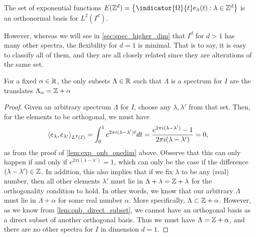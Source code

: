 \documentclass[../thesis.tex]{subfiles}
\begin{document}
\begin{theorem}\label{lem:z_d_in_higer_d}
    The set of exponential functions $E(\Z^d) = \braqMed{\indicator{\Omega}{t} e_\lambda(t) : \lambda \in \Z^d}$ is an orthonormal basis for $L^2(I^d)$.
\end{theorem}
However, whereas we will see in \cref{sec:spec_higher_dim} that $I^d$ for $d>1$ has many other spectra, the flexibility for $d=1$ is minimal. That is to say, it is easy to classify all of them, and they are all closely related since they are alterations of the same set.  %
\begin{proposition}\label{prop:class_all_shift}
    For a fixed $\alpha \in \mathbb{R}$, the only subsets $\Lambda \in \mathbb{R}$ such that $\Lambda$ is a spectrum for $I$ are the translates $\Lambda_\alpha = \mathbb{Z} + \alpha$
\end{proposition}
\begin{proof} %
    Given an arbitrary spectrum $\Lambda$ for $I$, choose any $\lambda,\lambda'$ from that set. Then, for the elements to be orthogonal, we must have
    \begin{equation}\label{eq:zero_set_equation}
        \left \langle e_{\lambda},e_{\lambda'}  \right \rangle_{L^2(I)} = \int_0^1 e^{2 \pi i (\lambda-\lambda')t} dt =\frac{e^{2 \pi i (\lambda - \lambda')} -1}{2 \pi i (\lambda-\lambda')} = 0,
    \end{equation}
    as from the proof of \cref{lem:exp_onb_onedim} above. Observe that this can only happen if and only if $e^{2\pi i (\lambda-\lambda')} = 1$, which can only be the case if the difference $(\lambda-\lambda') \in \mathbb{Z}$. In addition, this also implies that if we fix $\lambda$ to be any (real) number, then all other elements $\lambda'$ must lie in $\Lambda+\lambda = \mathbb{Z} + \lambda$ for the orthogonality condition to hold. In other words, we know that our arbitrary $\Lambda$ must lie in $\Lambda+\alpha$ for some real number $\alpha$. More specifically, $\Lambda \subset \mathbb{Z}+\alpha$. However, as we know from \cref{lem:onb_direct_subset}, we cannot have an orthogonal basis as a direct subset of another orthogonal basis. Thus we must have $\Lambda = \mathbb{Z}+\alpha$, and there are no other spectra for $I$ in dimension $d=1$.
\end{proof}
\end{document}

